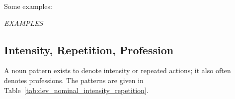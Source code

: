 \documentclass[grammar]{subfiles}
\begin{document}
  Some examples:

  \begin{exe}
    \ex \emph{EXAMPLES}
  \end{exe}

  \subsection{Intensity, Repetition, Profession}
  \label{ssec:dev_nouns_intensity_repetition_profession}

  A noun pattern exists to denote intensity or repeated actions; it also often denotes professions. 
  The patterns are given in Table~\ref{tab:dev_nominal_intensity_repetition}.

  \begin{table}[h!]\small\capstart
    \caption{Nouns of intensity and/or repetition\label{tab:dev_nominal_intensity_repetition}}
  \end{table}
\end{document}
